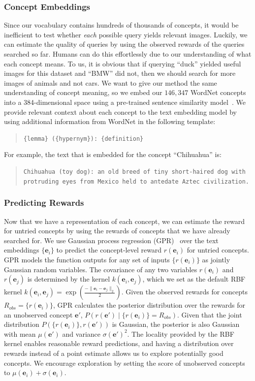 \subsubsection{Concept Embeddings}
Since our vocabulary contains hundreds of thousands of concepts, it would be inefficient to test whether \emph{each} possible query yields relevant images. Luckily, we can estimate the quality of queries by using the observed rewards of the queries searched so far. Humans can do this effortlessly due to our understanding of what each concept means. To us, it is obvious that if querying ``duck'' yielded useful images for this dataset and ``BMW'' did not, then we should search for more images of animals and not cars. We want to give our method the same understanding of concept meaning, so we embed our $146{,}347$ WordNet concepts into a 384-dimensional space using a pre-trained sentence similarity model~\cite{reimers2019sentence}. We provide relevant context about each concept to the text embedding model by using additional information from WordNet in the following template:

\begin{quote}
    {\tt {\small \{lemma\} (\{hypernym\}): \{definition\}}}
\end{quote}
For example, the text that is embedded for the concept ``Chihuahua'' is:

\begin{quote}
    {\tt {\small Chihuahua (toy dog): an old breed of tiny short-haired dog with protruding eyes from Mexico held to antedate Aztec civilization.}}
\end{quote}


\subsubsection{Predicting Rewards}
Now that we have a representation of each concept, we can estimate the reward for untried concepts by using the rewards of concepts that we have already searched for.
We use Gaussian process regression (GPR)~\cite{williams1995gaussian} over the text embeddings $\{\mathbf{e}_i\}$ to predict the concept-level reward $r(\mathbf{e}_i)$ for untried concepts. 
GPR models the function outputs for any set of inputs $\{r(\mathbf{e}_i)\}$ as jointly Gaussian random variables. 
The covariance of any two variables $r(\mathbf{e}_i)$ and $r(\mathbf{e}_j)$ is determined by the kernel $k(\mathbf{e}_i, \mathbf{e}_j)$, which we set as the default RBF kernel $k(\mathbf{e}_i, \mathbf{e}_j) = \exp(\frac{-\|\mathbf{e}_i - \mathbf{e}_j\|_2}{2})$. 
Given the observed rewards for concepts $R_{obs} = \{r(\mathbf e_i)\}$, GPR calculates the posterior distribution over the rewards for an unobserved concept $\mathbf e'$, $P(r(\mathbf e') \mid \{r(\mathbf{e}_i)\} = R_{obs})$. Given that the joint distribution  $P(\{r(\mathbf{e}_i)\}, r(\mathbf{e}'))$ is Gaussian, the posterior is also Gaussian with mean $\mu(\mathbf e')$ and variance $\sigma{(\mathbf e')}^2$. The locality provided by the RBF kernel enables reasonable reward predictions, and having a distribution over rewards instead of a point estimate allows us to explore potentially good concepts. We encourage exploration by setting the score of unobserved concepts to $\mu(\mathbf{e}_i) + \sigma(\mathbf{e}_i)$.

